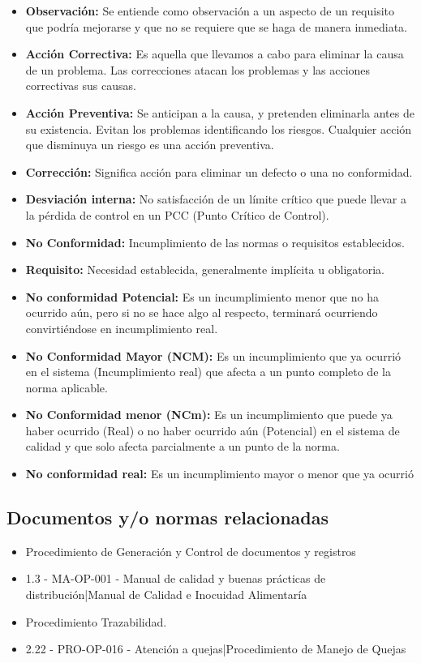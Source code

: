 \begin{itemize}
	\item \textbf{Observación:} Se entiende como observación a un aspecto de un requisito que podría mejorarse y que no se requiere que se haga de manera inmediata.
	\item \textbf{Acción Correctiva:} Es aquella que llevamos a cabo para eliminar la causa de un problema. Las correcciones atacan los problemas y las acciones correctivas sus causas.
	\item \textbf{Acción Preventiva:} Se anticipan a la causa, y pretenden eliminarla antes de su existencia. Evitan los problemas identificando los riesgos. Cualquier acción que disminuya un riesgo es una acción preventiva.
	\item \textbf{Corrección:} Significa acción para eliminar un defecto o una no conformidad.
	\item \textbf{Desviación interna:} No satisfacción de un límite crítico que puede llevar a la pérdida de control en un PCC (Punto Crítico de Control).
	\item \textbf{No Conformidad:} Incumplimiento de las normas o requisitos establecidos.
	\item \textbf{Requisito:} Necesidad establecida, generalmente implícita u obligatoria.
	\item \textbf{No conformidad Potencial:} Es un incumplimiento menor que no ha ocurrido aún, pero si no se hace algo al respecto, terminará ocurriendo convirtiéndose en incumplimiento real.
	\item \textbf{No Conformidad Mayor (NCM):} Es un incumplimiento que ya ocurrió en el sistema (Incumplimiento real) que afecta a un punto completo de la norma aplicable.
	\item \textbf{No Conformidad menor (NCm):} Es un incumplimiento que puede ya haber ocurrido (Real) o no haber ocurrido aún (Potencial) en el sistema de calidad y que solo afecta parcialmente a un punto de la norma.
	\item \textbf{No conformidad real:} Es un incumplimiento mayor o menor que ya ocurrió
\end{itemize}

\subsection{Documentos y/o normas relacionadas}

\begin{itemize}
	\item Procedimiento de Generación y Control de documentos y registros %
	\item 1.3 - MA-OP-001 - Manual de calidad y buenas prácticas de distribución|Manual de Calidad e Inocuidad Alimentaría %
	\item Procedimiento Trazabilidad. %
	\item 2.22 - PRO-OP-016 - Atención a quejas|Procedimiento de Manejo de Quejas %
\end{itemize}

